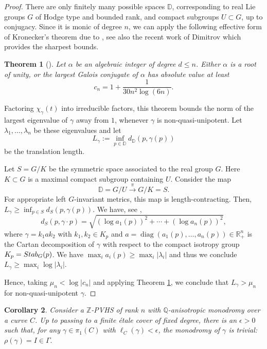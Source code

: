 \documentclass[10pt,letterpaper,english,reqno]{amsart}
\numberwithin{equation}{subsection}
\newcommand\bD{{\mathbb D}}
\newcommand\Q{{\mathbb Q}}
\newcommand\R{{\mathbb R}}
\newcommand\Z{{\mathbb Z}}
\DeclareMathOperator{\diag}{diag}
\newtheorem{theorem}{Theorem}[section]
\newtheorem{corollary}[theorem]{Corollary}
\theoremstyle{definition}
\begin{document}
\begin{proof} There are only finitely many possible spaces $\bD$, 
corresponding to real Lie groups $G$
of Hodge type and bounded rank,
and compact subgroups $U\subset G$, up to conjugacy. 
Since it is monic of degree $n$, we can apply the following effective form of Kronecker's theorem due to \cite[Corollary]{blanksby}, see also the recent work of Dimitrov \cite[Theorem 1]{dimitrov-schinzel} which provides the sharpest bounds.

\begin{theorem}[\cite{blanksby}]\label{blanks} Let $\alpha$ be an algebraic integer of degree $d\leq n$.
Either $\alpha$ is a root of unity, or the largest Galois conjugate of $\alpha$ has absolute value at least $$c_n = 1+\frac{1}{30n^2\log(6n)}.$$
\end{theorem}

Factoring $\chi_\gamma(t)$ into irreducible factors, 
this theorem bounds the norm of the
largest eigenvalue of  $\gamma$ away from $1$,
whenever $\gamma$ is non-quasi-unipotent.
Let $\lambda_1, \dots, \lambda_n$ be these
eigenvalues and let 
$$L_\gamma:=\inf_{p\in \bD}
d_\bD(p,\gamma(p))$$ be the translation length.

Let $S=G/K$ be the symmetric space
associated to the real group $G$. Here
$K\subset G$ is a maximal compact
subgroup containing $U$. Consider the map $$\bD=G/U\xrightarrow{\pi} G/K=S.$$ For appropriate left $G$-invariant
metrics, this map is length-contracting.
Then, $L_\gamma\geq \inf_{p\in S} d_S(p,\gamma(p))$.
We have, see \cite[Ex.~7.1]{breuillard-fujiwara},
\[d_S(p,\gamma\cdot p)=\sqrt{(\log a_1(p))^2+\cdots
+(\log a_n(p))^2},\]
where $\gamma=k_1ak_2$ with $k_1,k_2\in K_p$ and $a=\diag(a_1(p),\ldots,a_n(p))\in \R_+^n$ is the Cartan decomposition
of $\gamma$ with respect to the compact isotropy
group $K_p = {\rm Stab}_G(p)$. We have $\max_i a_i(p)\geq \max_i |\lambda_i|$ and thus we conclude $L_\gamma\geq \max_i \log |\lambda_i|$.

Hence, taking $\mu_n<\log|c_n|$ and applying
Theorem \ref{blanks},
we conclude that $L_\gamma> \mu_n$
for non-quasi-unipotent $\gamma$.
\end{proof}


\begin{corollary}\label{monodromy-trivial}
Consider a $\Z$-PVHS of rank $n$
with $\Q$-anisotropic monodromy over a curve $C$. Up to passing to
a finite \'etale cover of fixed degree, there is an $\epsilon>0$
such that, for any $\gamma\in \pi_1(C)$ with $\ell_C(\gamma)<\epsilon$, the monodromy of $\gamma$ is trivial: $\rho(\gamma)=I\in \Gamma.$
\end{corollary}
\end{document}
